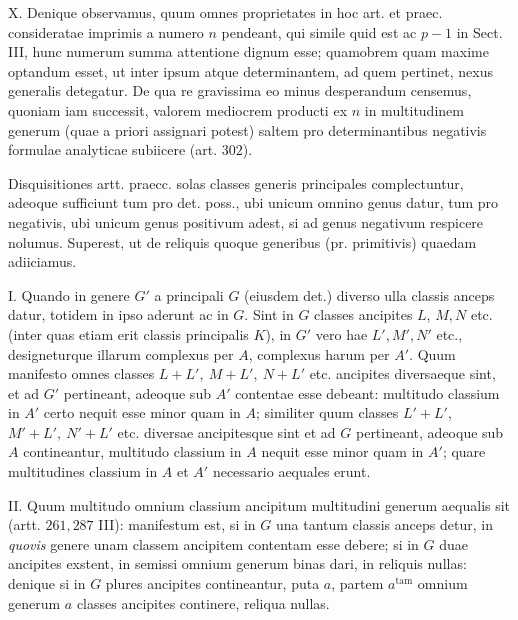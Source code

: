 X. Denique observamus, quum omnes proprietates in hoc art. et praec. consideratae imprimis a numero \(n\) pendeant, qui simile quid est ac \(p-1\) in Sect. III, hunc numerum summa attentione dignum esse; quamobrem quam maxime optandum esset, ut inter ipsum atque determinantem, ad quem pertinet, nexus generalis detegatur. De qua re gravissima eo minus desperandum censemus, quoniam iam successit, valorem mediocrem producti ex \(n\) in multitudinem generum (quae a priori assignari potest) saltem pro determinantibus negativis formulae analyticae subiicere (art. \(302\)).

Disquisitiones artt. praecc. solas classes generis principales complectuntur, adeoque sufficiunt tum pro det. poss., ubi unicum omnino genus datur, tum pro negativis, ubi unicum genus positivum adest, si ad genus negativum respicere nolumus. Superest, ut de reliquis quoque generibus (pr. primitivis) quaedam adiiciamus.

I. Quando in genere \(G'\) a principali \(G\) (eiusdem det.) diverso ulla classis anceps datur, totidem in ipso aderunt ac in \(G\). Sint in \(G\) classes ancipites \(L\), \(M,N\) etc. (inter quas etiam erit classis principalis \(K\)), in \(G'\) vero hae \(L',M',N'\) etc., designeturque illarum complexus per \(A\), complexus harum per \(A'\). Quum manifesto omnes classes \(L+L',\ M+L',\ N+L'\) etc. ancipites diversaeque sint, et ad \(G'\) pertineant, adeoque sub \(A'\) contentae esse debeant: multitudo classium in \(A'\) certo nequit esse minor quam in \(A\); similiter quum classes \(L'+L'\), \(M'+L',\ N'+L'\) etc. diversae ancipitesque sint et ad \(G\) pertineant, adeoque sub \(A\) contineantur, multitudo classium in \(A\) nequit esse minor quam in \(A'\); quare multitudines classium in \(A\) et \(A'\) necessario aequales erunt.

II. Quum multitudo omnium classium ancipitum multitudini generum aequalis sit (artt. \(261,287\) III): manifestum est, si in \(G\) una tantum classis anceps
detur, in \textit{quovis} genere unam classem ancipitem contentam esse debere; si in \(G\) duae ancipites exstent, in semissi omnium generum binas dari, in reliquis nullas: denique si in \(G\) plures ancipites contineantur, puta \(a\), partem \(a^{\mathrm{tam}}\) omnium generum \(a\) classes ancipites continere, reliqua nullas.

